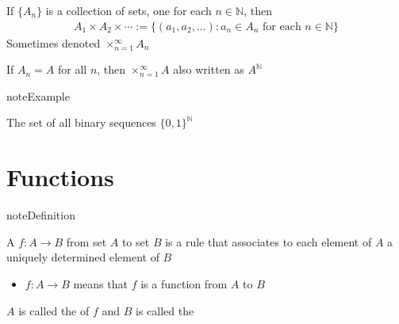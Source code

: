 \documentclass[letterpaper,10pt,english]{jupyterBook}
\begin{document}
\sphinxAtStartPar
If \(\{A_n\}\) is a collection of sets, one
for each \(n \in \mathbb{N}\), then
\begin{equation*}
\begin{split}
A_1 \times A_2 \times \cdots 
:= \{ (a_1, a_2, \ldots) : a_n \in A_n \text{ for each } n \in \mathbb{N} \}
\end{split}
\end{equation*}
\sphinxAtStartPar
Sometimes denoted \(\times_{n=1}^{\infty} A_n\)

\sphinxAtStartPar
If \(A_n = A\) for all \(n\), then \(\times_{n=1}^{\infty} A\) also written as \(A^{\mathbb{N}}\)

\begin{sphinxadmonition}{note}{Example}

\sphinxAtStartPar
The set of all binary sequences \(\{0, 1\}^{\mathbb{N}}\)
\end{sphinxadmonition}


\section{Functions}
\label{\detokenize{03.set_theory:functions}}
\begin{sphinxadmonition}{note}{Definition}

\sphinxAtStartPar
A  \(f \colon A \rightarrow B\) from set \(A\) to set \(B\) is a rule that
associates to each element of \(A\) a uniquely determined element of \(B\)
\end{sphinxadmonition}
\begin{itemize}
\item {} 
\sphinxAtStartPar
\(f \colon A \to B\) means that \(f\) is a function from \(A\) to \(B\)

\end{itemize}

\begin{figure}[htbp]
\centering

\noindent{}
\end{figure}

\sphinxAtStartPar
\(A\) is called the  of \(f\) and \(B\) is called the 
\end{document}
